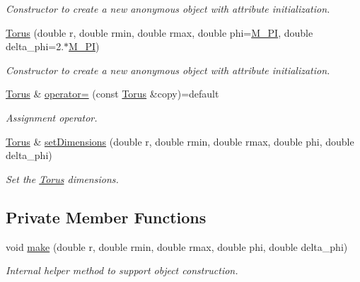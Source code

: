 \begin{DoxyCompactItemize}
\begin{DoxyCompactList}\small\item\em Constructor to create a new anonymous object with attribute initialization. \end{DoxyCompactList}\item 
\hyperlink{class_d_d4hep_1_1_geometry_1_1_torus_aafbe7786b4554751775d5038fcbf8d3a}{Torus} (double r, double rmin, double rmax, double phi=\hyperlink{_x_m_l_elements_8h_ae71449b1cc6e6250b91f539153a7a0d3}{M\+\_\+\+PI}, double delta\+\_\+phi=2.$\ast$\hyperlink{_x_m_l_elements_8h_ae71449b1cc6e6250b91f539153a7a0d3}{M\+\_\+\+PI})
\begin{DoxyCompactList}\small\item\em Constructor to create a new anonymous object with attribute initialization. \end{DoxyCompactList}\item 
\hyperlink{class_d_d4hep_1_1_geometry_1_1_torus}{Torus} \& \hyperlink{class_d_d4hep_1_1_geometry_1_1_torus_a73b9809f6a7e125ff1b6a850aed1fda1}{operator=} (const \hyperlink{class_d_d4hep_1_1_geometry_1_1_torus}{Torus} \&copy)=default
\begin{DoxyCompactList}\small\item\em Assignment operator. \end{DoxyCompactList}\item 
\hyperlink{class_d_d4hep_1_1_geometry_1_1_torus}{Torus} \& \hyperlink{class_d_d4hep_1_1_geometry_1_1_torus_a41bf8eb0dae9ebabda620358cad1c648}{set\+Dimensions} (double r, double rmin, double rmax, double phi, double delta\+\_\+phi)
\begin{DoxyCompactList}\small\item\em Set the \hyperlink{class_d_d4hep_1_1_geometry_1_1_torus}{Torus} dimensions. \end{DoxyCompactList}\end{DoxyCompactItemize}
\subsection*{Private Member Functions}
\begin{DoxyCompactItemize}
\item 
void \hyperlink{class_d_d4hep_1_1_geometry_1_1_torus_afdb3cd4dc6b2095d511330920f0db3fa}{make} (double r, double rmin, double rmax, double phi, double delta\+\_\+phi)
\begin{DoxyCompactList}\small\item\em Internal helper method to support object construction. \end{DoxyCompactList}\end{DoxyCompactItemize}
